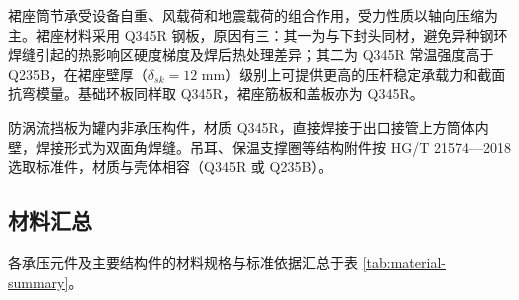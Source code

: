 裙座筒节承受设备自重、风载荷和地震载荷的组合作用，受力性质以轴向压缩为主。裙座材料采用 Q345R 钢板，原因有三：其一为与下封头同材，避免异种钢环焊缝引起的热影响区硬度梯度及焊后热处理差异；其二为 Q345R 常温强度高于 Q235B，在裙座壁厚（$\delta_{sk} = 12$ mm）级别上可提供更高的压杆稳定承载力和截面抗弯模量。基础环板同样取 Q345R，裙座筋板和盖板亦为 Q345R\cite{nbt47041-2014}。

防涡流挡板为罐内非承压构件，材质 Q345R，直接焊接于出口接管上方筒体内壁，焊接形式为双面角焊缝。吊耳、保温支撑圈等结构附件按 HG/T 21574—2018\cite{hgt21574-2018} 选取标准件，材质与壳体相容（Q345R 或 Q235B）。

\subsection{材料汇总}

各承压元件及主要结构件的材料规格与标准依据汇总于表 \ref{tab:material-summary}。

